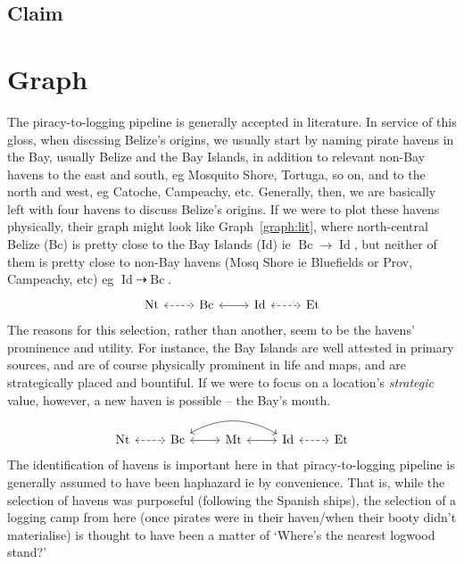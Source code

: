 \documentclass{amsart}
\DeclareMathOperator{\id}{Id}%
\DeclareMathOperator{\mt}{Mt}%
\DeclareMathOperator{\bc}{Bc}%
\DeclareMathOperator{\et}{Et}%
\DeclareMathOperator{\nt}{Nt}%
\theoremstyle{definition}%
\theoremstyle{definition}%
\theoremstyle{remark}%
\theoremstyle{definition}%
\theoremstyle{definition}%
\begin{document}
\subsection{Claim}
\label{ss:claim}
%
%
%
%
\section{Graph}
\label{s:graph}
The piracy-to-logging pipeline is generally accepted in literature. In service of this gloss, when discssing Belize's origins, we usually start by naming pirate havens in the Bay, usually Belize and the Bay Islands, in addition to relevant non-Bay havens to the east and south, eg Mosquito Shore, Tortuga, so on, and to the north and west, eg Catoche, Campeachy, etc. Generally, then, we are basically left with four havens to discuss Belize's origins. If we were to plot these havens physically, their graph might look like Graph~\ref{graph:lit}, where north-central Belize (Bc) is pretty close to the Bay Islands (Id) ie \(\bc\to\id\), but neither of them is pretty close to non-Bay havens (Mosq Shore ie Bluefields or Prov, Campeachy, etc) eg \(\id\dashrightarrow\bc\).
%
\begin{equation}
\label{graph:lit}%
\begin{tikzcd}[arrows=leftrightarrow]
\nt \rar[dashed] &\bc \rar &\id \rar[dashed] &\et
\end{tikzcd}
\end{equation}
%
The reasons for this selection, rather than another, seem to be the havens' prominence and utility. For instance, the Bay Islands are well attested in primary sources, and are of course physically prominent in life and maps, and are strategically placed and bountiful. If we were to focus on a location's \emph{strategic} value, however, a new haven is possible -- the Bay's mouth.
%
\begin{equation}
\label{graph:prop}%
\begin{tikzcd}[arrows=leftrightarrow]
\nt \rar[dashed] &\bc \rar \ar[rr,bend left] &\mt \rar &\id \rar[dashed] &\et
\end{tikzcd}
\end{equation}
%
The identification of havens is important here in that piracy-to-logging pipeline is generally assumed to have been haphazard ie by convenience. That is, while the selection of havens was purposeful (following the Spanish ships), the selection of a logging camp from here (once pirates were in their haven/when their booty didn't materialise) is thought to have been a matter of `Where's the nearest logwood stand?' %
\end{document}
